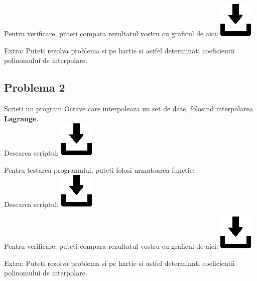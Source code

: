 \documentclass{article}
\begin{document}
Pentru verificare, puteti compara rezultatul vostru cu graficul de aici: \href{https://github.com/Iulian277/Interpolation/blob/main/Vandermonde/vandermonde_res.svg}{\includegraphics[scale=0.35]{download_button}}

Extra: Puteti rezolva problema si pe hartie si astfel determinati coeficientii polinomului de interpolare.\pagebreak


\subsection{Problema 2}
\tab Scrieti un program Octave care interpoleaza un set de date, folosind interpolarea \textbf{Lagrange}.\\
\tabto{0.5cm} Descarca scriptul:
\href{https://github.com/Iulian277/Interpolation/blob/main/Lagrange/lagrange.m}{\includegraphics[scale=0.35]{download_button}}
\vspace{0.25cm}

Pentru testarea programului, puteti folosi urmatoarea functie:\\
\tabto{0.5cm} Descarca scriptul:
\href{https://github.com/Iulian277/Interpolation/blob/main/Lagrange/test_lagrange.m}{\includegraphics[scale=0.35]{download_button}}


Pentru verificare, puteti compara rezultatul vostru cu graficul de aici: \href{https://github.com/Iulian277/Interpolation/blob/main/Lagrange/lagrange_res.svg}{\includegraphics[scale=0.35]{download_button}}

Extra: Puteti rezolva problema si pe hartie si astfel determinati coeficientii polinomului de interpolare.\pagebreak
\end{document}
